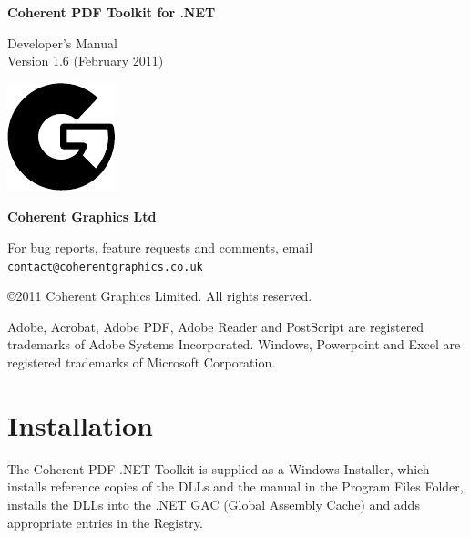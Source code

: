\documentclass[a4paper]{memoir}
\newcommand{\smallgap}{\vspace{4mm}}
\begin{document}
\frontmatter
\thispagestyle{empty}

\begin{flushright}

{\sffamily \bfseries \Huge Coherent PDF Toolkit for .NET}

\vspace{12mm}

{\Huge Developer's Manual}\\\vspace{2mm}
Version 1.6 (February 2011)

\vspace{25mm}

\vfill

\includegraphics{logo.pdf}

\vspace{2mm}
{\sffamily \bfseries \LARGE Coherent Graphics Ltd}

\end{flushright}

\clearpage

\thispagestyle{empty}
\noindent For bug reports, feature requests and comments, email\\ \texttt{contact@coherentgraphics.co.uk}

\vspace*{\fill}
\noindent\copyright 2011 Coherent Graphics Limited. All rights reserved.

\smallgap 
\noindent Adobe, Acrobat, Adobe PDF, Adobe Reader and PostScript are
registered trademarks of Adobe Systems Incorporated. Windows, Powerpoint and
Excel are registered trademarks of Microsoft Corporation.

\cleardoublepage
\tableofcontents

\cleardoublepage
\mainmatter
{}
\pagestyle{ruled}
\chapter{Installation}
The Coherent PDF .NET Toolkit is supplied as a Windows Installer, which installs reference copies of the DLLs and the manual in the Program Files Folder, installs the DLLs into the .NET GAC (Global Assembly Cache) and adds appropriate entries in the Registry.
\end{document}
